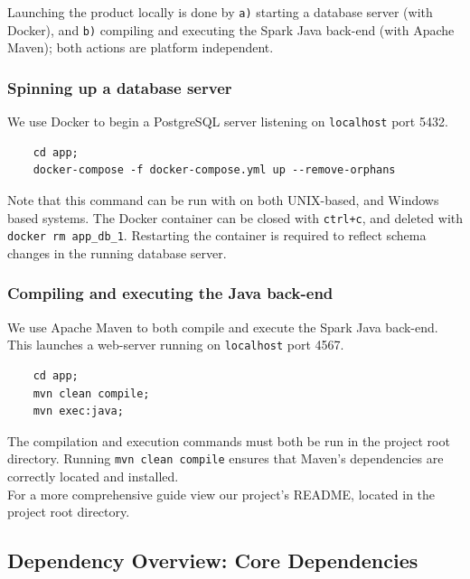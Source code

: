 \documentclass[9pt, titlepage]{extarticle}
\begin{document}
Launching the product locally is done by \texttt{a)} starting a database server (with Docker), and \texttt{b)} compiling and executing the Spark Java back-end (with Apache Maven); both actions are platform independent. 

\subsubsection{Spinning up a database server}
We use Docker to begin a PostgreSQL \cite{web:psql} server listening on \texttt{localhost} port 5432.
\begin{verbatim}
    cd app;
    docker-compose -f docker-compose.yml up --remove-orphans
\end{verbatim}

Note that this command can be run with on both UNIX-based, and Windows based systems. The Docker container can be closed with \texttt{ctrl+c}, and deleted with \texttt{docker rm app\_db\_1}. Restarting the container is required to reflect schema changes in the running database server.

\subsubsection{Compiling and executing the Java back-end}
We use Apache Maven to both compile and execute the Spark Java \cite{web:spark} back-end. This launches a web-server running on \texttt{localhost} port 4567.
\begin{verbatim}
    cd app;
    mvn clean compile;
    mvn exec:java;
\end{verbatim}
The compilation and execution commands must both be run in the project root directory. Running \texttt{mvn clean compile} ensures that Maven's dependencies are correctly located and installed. \\

For a more comprehensive guide view our project's README, located in the project root directory.

\subsection{Dependency Overview: Core Dependencies}
\end{document}
